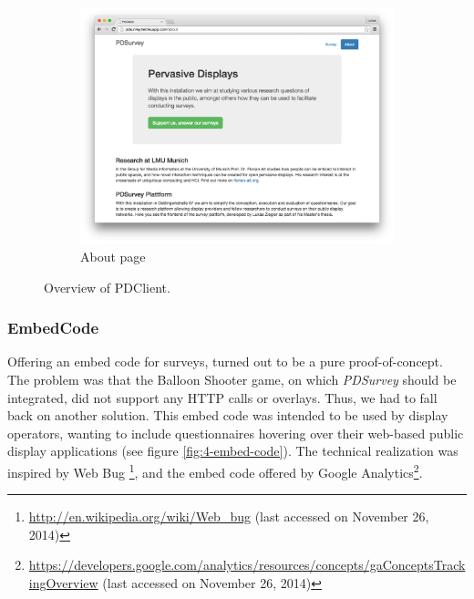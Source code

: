 \begin{figure}
		    \begin{subfigure}[b]{0.6\textwidth}
		        \centering
		        \includegraphics[width=\textwidth]{img/screenshots/pdclient/about}
		        \caption{About page}
		        \label{fig:4-pdclient-about}
		    \end{subfigure}
		    \caption{Overview of PDClient.}
		    \label{fig:pdclient-screenshots}
		\end{figure}



	\subsubsection{EmbedCode}

		Offering an embed code for surveys, turned out to be a pure proof-of-concept. The problem was that the Balloon Shooter game, on which \textit{PDSurvey} should be integrated, did not support any HTTP calls or overlays. Thus, we had to fall back on another solution. This embed code was intended to be used by display operators, wanting to include questionnaires hovering over their web-based public display applications (see figure \ref{fig:4-embed-code}). The technical realization was inspired by Web Bug \footnote{\url{http://en.wikipedia.org/wiki/Web_bug} (last accessed on November 26, 2014)}, and the embed code offered by Google Analytics\footnote{\url{https://developers.google.com/analytics/resources/concepts/gaConceptsTrackingOverview} (last accessed on November 26, 2014)}.

